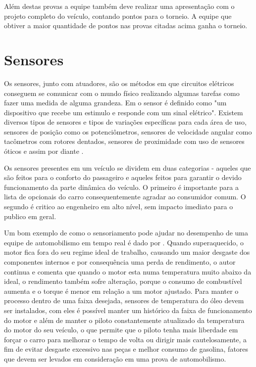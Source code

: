 Além destas provas a equipe também deve realizar uma apresentação com o projeto completo do veículo, contando pontos para o torneio. A equipe que obtiver a maior quantidade de pontos nas provas citadas acima ganha o torneio.

\section{Sensores}
\label{sec:sensores}
Os sensores, junto com atuadores, são os métodos em que circuitos elétricos conseguem se comunicar com o mundo físico realizando algumas tarefas como fazer uma medida de alguma grandeza. Em  o sensor é definido como "um dispositivo que recebe um estimulo e responde com um sinal elétrico". Existem diversos tipos de sensores e tipos de variações específicas para cada área de uso, sensores de posição como os potenciômetros, sensores de velocidade angular como tacômetros com rotores dentados, sensores de proximidade com uso de sensores óticos e assim por diante \cite{kilian2001modern}. 

Os sensores presentes em um veículo se dividem em duas categorias \cite{vehicleDataAcquisition2014} - aqueles que são feitos para o conforto do passageiro e aqueles feitos para garantir o devido funcionamento da parte dinâmica do veículo. O primeiro é importante para a lista de opcionais do carro consequentemente agradar ao consumidor comum. O segundo é critico ao engenheiro em alto nível, sem impacto imediato para o publico em geral.

Um bom exemplo de como o sensoriamento pode ajudar no desempenho de uma equipe de automobilismo em tempo real é dado por . Quando superaquecido, o motor fica fora do seu regime ideal de trabalho, causando um maior desgaste dos componentes internos e por consequência uma perda de rendimento, o autor continua e comenta que quando o motor esta numa temperatura muito abaixo da ideal, o rendimento também sofre alteração, porque o consumo de combustível aumenta e o torque é menor em relação a um motor ajustado. Para manter o processo dentro de uma faixa desejada, sensores de temperatura do óleo devem ser instalados, com eles é possível manter um histórico da faixa de funcionamento do motor e além de manter o piloto constantemente atualizado da temperatura do motor do seu veículo, o que permite que o piloto tenha mais liberdade em forçar o carro para melhorar o tempo de volta ou dirigir mais cautelosamente, a fim de evitar desgaste excessivo nas peças e melhor consumo de gasolina, fatores que devem ser levados em consideração em uma prova de automobilismo. 

